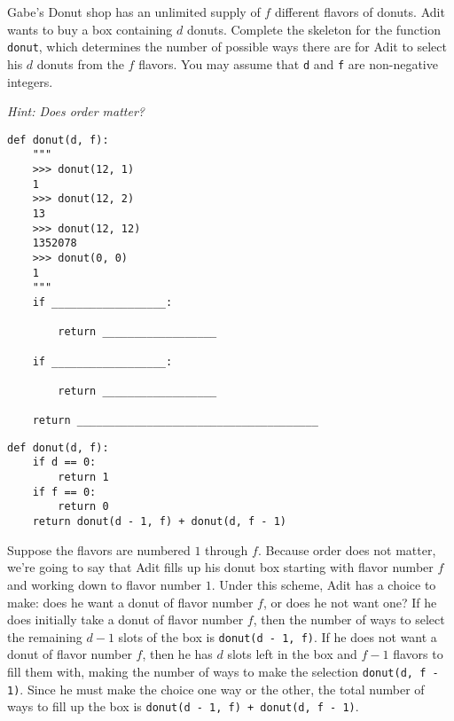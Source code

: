 \begin{blocksection}
\question Gabe's Donut shop has an unlimited supply of $f$ different flavors of donuts. Adit wants to buy a box containing $d$ donuts. Complete the skeleton for the function \lstinline{donut}, which determines the number of possible ways there are for Adit to select his $d$ donuts from the $f$ flavors. You may assume that \lstinline{d} and \lstinline{f} are non-negative integers. 

\textit{Hint: Does order matter?}

\begin{lstlisting}
def donut(d, f):
    """
    >>> donut(12, 1)
    1
    >>> donut(12, 2)
    13
    >>> donut(12, 12)
    1352078
    >>> donut(0, 0)
    1
    """
    if __________________:

        return __________________

    if __________________:

        return __________________

    return ______________________________________
\end{lstlisting}

\begin{solution}[0in]
\begin{lstlisting}
def donut(d, f):
    if d == 0:
        return 1
    if f == 0:
        return 0
    return donut(d - 1, f) + donut(d, f - 1)
\end{lstlisting}

Suppose the flavors are numbered $1$ through $f$. Because order does not matter, we're going to say that Adit fills up his donut box starting with flavor number $f$ and working down to flavor number $1$. Under this scheme, Adit has a choice to make: does he want a donut of flavor number $f$, or does he not want one? If he does initially take a donut of flavor number $f$, then the number of ways to select the remaining $d - 1$ slots of the box is \lstinline{donut(d - 1, f)}. If he does not want a donut of flavor number $f$, then he has $d$ slots left in the box and $f - 1$ flavors to fill them with, making the number of ways to make the selection \lstinline{donut(d, f - 1)}. Since he must make the choice one way or the other, the total number of ways to fill up the box is \lstinline{donut(d - 1, f) + donut(d, f - 1)}. 
\end{solution}
\end{blocksection}

